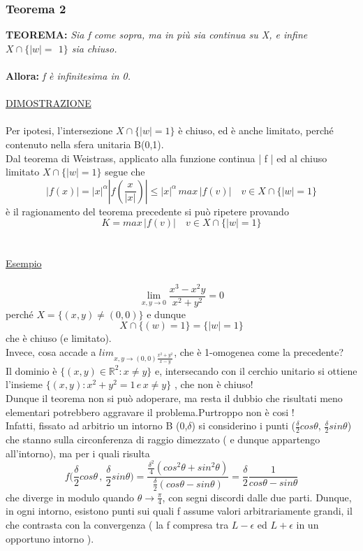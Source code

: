 \documentclass[fontsize = 20px, paper = a4]{article}
\begin{document}
\subsubsection{Teorema 2}
\textbf{TEOREMA:} \emph{Sia f come sopra, ma in più sia continua su X, e infine $X \cap \{|w| =$ \hspace*{2.3cm}$1\}$ sia chiuso.}
\\ \\
\textbf{Allora: } \emph {f è infinitesima in 0.}
\\ \\
\underline{DIMOSTRAZIONE}
\\ \\
Per ipotesi, l'intersezione $X \cap \{|w| = 1 \}$ è chiuso, ed è anche limitato, perché contenuto nella sfera unitaria B(0,1).\\
Dal teorema di Weistrass, applicato alla funzione continua | f | ed al chiuso limitato $X \cap \{ |w| = 1 \}$ segue che 
$$|f(x)| = |x|^\alpha | f \left( \frac{x}{|x|} \right ) | \le |x|^\alpha \, max \, |f(v)|  \quad v\in X \cap \{ |w| = 1 \}$$
è il ragionamento del teorema precedente si può ripetere provando
$$K = max \, |f(v)| \quad v \in X \cap \{|w| = 1 \}$$ 
\\\\
\underline{Esempio}
\\\\
$$\lim_{x,y \to 0} \frac{x^3 - x^2y}{x^2 + y^2} = 0$$
perché $X = \{(x,y) \neq (0,0) \}$ e dunque 
$$X \cap \{(w) = 1 \} = \{|w| = 1\}$$
che è chiuso (e limitato). \\
Invece, cosa accade a $lim_{x,y \to (0,0) \frac{x^2 + y^2}{x-y}}$, che è 1-omogenea come la precedente? \\
Il dominio è $\{ (x,y) \in \mathbb{R}^2 : x \neq y \}$ e, intersecando con il cerchio unitario si ottiene l'insieme $\{ (x,y): x^2 + y^2 = 1 \, e \, x \neq y \}$ , che non è chiuso!\\
Dunque il teorema non si può adoperare, ma resta il dubbio che risultati meno elementari potrebbero aggravare il problema.Purtroppo non è cosi ! \\
Infatti, fissato ad arbitrio un intorno B (0,$\delta$) si considerino i punti ($\frac{\delta}{2} cos\theta$, $\frac{\delta}{2} sin\theta$) che stanno sulla circonferenza di raggio dimezzato ( e dunque appartengo all'intorno), ma per i quali risulta
$$f\Big(\frac{\delta}{2} cos\theta \, , \, \frac{\delta}{2} sin \theta \Big) = \frac{\frac{\delta ^ 2}{4}(cos^2 \theta + sin^2 \theta )}{\frac{\delta}{2} (cos \theta - sin \theta)} = \frac{\delta}{2} \frac{1}{cos \theta - sin \theta}$$
che diverge in modulo quando $\theta \to \frac{\pi}{4}$, con segni discordi dalle due parti. Dunque, in ogni intorno, esistono punti sui quali f assume valori arbitrariamente grandi, il che contrasta con la convergenza ( la f compresa tra 
$L - \epsilon$ ed $L + \epsilon$ in un opportuno intorno ). \\
\end{document}
